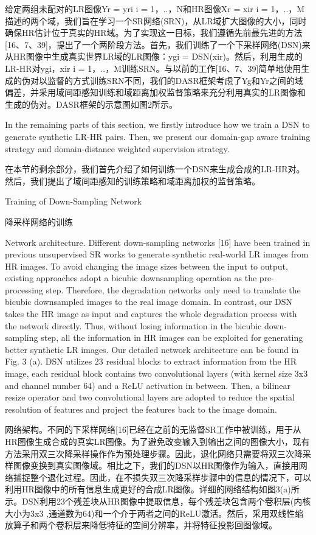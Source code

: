 给定两组未配对的LR图像Yr = {yri} i = 1，..，N和HR图像Xr = {xir} i = 1，..，M描述的两个域，我们旨在学习一个SR网络(SRN)，从LR域扩大图像的大小，同时确保HR估计位于真实的HR域。为了实现这一目标，我们遵循先前最先进的方法[16、7、39]，提出了一个两阶段方法。首先，我们训练了一个下采样网络(DSN)来从HR图像中生成真实世界LR域的LR图像：ygi = DSN(xir)。然后，利用生成的LR-HR对{ygi，xir} i = 1，..，M训练SRN。与以前的工作[16、7、39]简单地使用生成的伪对以监督的方式训练SRN不同，我们的DASR框架考虑了Yg和Yr之间的域偏差，并采用域间距感知训练和域距离加权监督策略来充分利用真实的LR图像和生成的伪对。DASR框架的示意图如图2所示。

In the remaining parts of this section, we firstly introduce how we train a DSN to generate synthetic LR-HR pairs. Then, we present our domain-gap aware training strategy and domain-distance weighted supervision strategy.

在本节的剩余部分，我们首先介绍了如何训练一个DSN来生成合成的LR-HR对。然后，我们提出了域间距感知的训练策略和域距离加权的监督策略。

Training of Down-Sampling Network

降采样网络的训练

Network architecture. Different down-sampling networks [16] have been trained in previous unsupervised SR works to generate synthetic real-world LR images from HR images. To avoid changing the image sizes between the input to output, existing approaches adopt a bicubic downsampling operation as the pre-processing step. Therefore, the degradation networks only need to translate the bicubic downsampled images to the real image domain. In contrast, our DSN takes the HR image as input and captures the whole degradation process with the network directly. Thus, without losing information in the bicubic down-sampling step, all the information in HR images can be exploited for generating better synthetic LR images. Our detailed network architecture can be found in Fig. 3 (a). DSN utilizes 23 residual blocks to extract information from the HR image, each residual block contains two convolutional layers (with kernel size 3x3 and channel number 64) and a ReLU activation in between. Then, a bilinear resize operator and two convolutional layers are adopted to reduce the spatial resolution of features and project the features back to the image domain.

网络架构。不同的下采样网络[16]已经在之前的无监督SR工作中被训练，用于从HR图像生成合成的真实LR图像。为了避免改变输入到输出之间的图像大小，现有方法采用双三次降采样操作作为预处理步骤。因此，退化网络只需要将双三次降采样图像变换到真实图像域。相比之下，我们的DSN以HR图像作为输入，直接用网络捕捉整个退化过程。因此，在不损失双三次降采样步骤中的信息的情况下，可以利用HR图像中的所有信息生成更好的合成LR图像。详细的网络结构如图3(a)所示。DSN利用23个残差块从HR图像中提取信息，每个残差块包含两个卷积层(内核大小为3x3 ,通道数为64)和一个介于两者之间的ReLU激活。然后，采用双线性缩放算子和两个卷积层来降低特征的空间分辨率，并将特征投影回图像域。


